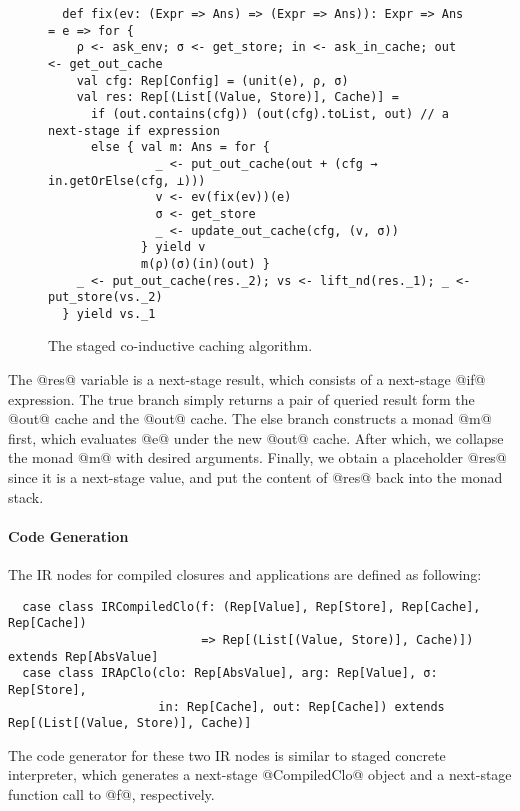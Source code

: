 \vspace{-1em}
\begin{figure}[h!]
  \centering
\begin{lstlisting}
  def fix(ev: (Expr => Ans) => (Expr => Ans)): Expr => Ans = e => for {
    ρ <- ask_env; σ <- get_store; in <- ask_in_cache; out <- get_out_cache
    val cfg: Rep[Config] = (unit(e), ρ, σ)
    val res: Rep[(List[(Value, Store)], Cache)] =
      if (out.contains(cfg)) (out(cfg).toList, out) // a next-stage if expression
      else { val m: Ans = for {
               _ <- put_out_cache(out + (cfg → in.getOrElse(cfg, ⊥)))
               v <- ev(fix(ev))(e)
               σ <- get_store
               _ <- update_out_cache(cfg, (v, σ))
             } yield v
             m(ρ)(σ)(in)(out) }
    _ <- put_out_cache(res._2); vs <- lift_nd(res._1); _ <- put_store(vs._2)
  } yield vs._1
\end{lstlisting}
\vspace{-1em}
\caption{The staged co-inductive caching algorithm.}
\label{fig:staged_coind_cache}
\end{figure}
\vspace{-1em}

The @res@ variable is a next-stage result, which consists of a next-stage @if@
expression. The true branch simply returns a pair of queried result form the
@out@ cache and the @out@ cache. The else branch constructs a monad @m@ first,
which evaluates @e@ under the new @out@ cache. After which, we collapse the
monad @m@ with desired arguments. Finally, we obtain a placeholder @res@ since
it is a next-stage value, and put the content of @res@ back into the monad
stack.

\paragraph{Code Generation} The IR nodes for compiled closures and
applications are defined as following:

\begin{lstlisting}
  case class IRCompiledClo(f: (Rep[Value], Rep[Store], Rep[Cache], Rep[Cache])
                           => Rep[(List[(Value, Store)], Cache)]) extends Rep[AbsValue]
  case class IRApClo(clo: Rep[AbsValue], arg: Rep[Value], σ: Rep[Store],
                     in: Rep[Cache], out: Rep[Cache]) extends Rep[(List[(Value, Store)], Cache)]
\end{lstlisting}

The code generator for these two IR nodes is similar to staged concrete
interpreter, which generates a next-stage @CompiledClo@ object and a next-stage
function call to @f@, respectively.
                   

